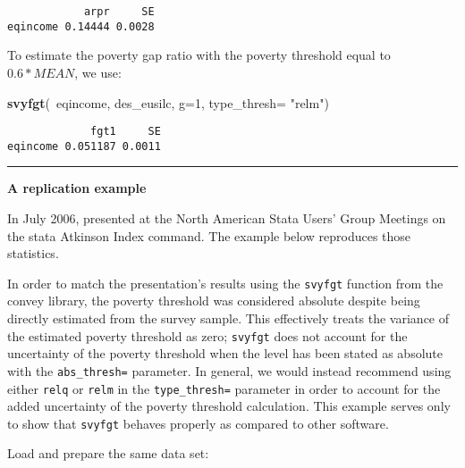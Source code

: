 \documentclass[]{book}
\newenvironment{Shaded}{\begin{snugshade}}{\end{snugshade}}
\newcommand{\KeywordTok}[1]{\textcolor[rgb]{0.13,0.29,0.53}{\textbf{{#1}}}}
\newcommand{\DataTypeTok}[1]{\textcolor[rgb]{0.13,0.29,0.53}{{#1}}}
\newcommand{\DecValTok}[1]{\textcolor[rgb]{0.00,0.00,0.81}{{#1}}}
\newcommand{\StringTok}[1]{\textcolor[rgb]{0.31,0.60,0.02}{{#1}}}
\newcommand{\NormalTok}[1]{{#1}}
\begin{document}
\begin{verbatim}
            arpr     SE
eqincome 0.14444 0.0028
\end{verbatim}

To estimate the poverty gap ratio with the poverty threshold equal to
\(0.6*MEAN\), we use:

\begin{Shaded}
\begin{Highlighting}[]
\KeywordTok{svyfgt}\NormalTok{(~eqincome, des_eusilc, }\DataTypeTok{g=}\DecValTok{1}\NormalTok{, }\DataTypeTok{type_thresh=} \StringTok{"relm"}\NormalTok{)}
\end{Highlighting}
\end{Shaded}

\begin{verbatim}
             fgt1     SE
eqincome 0.051187 0.0011
\end{verbatim}

\begin{center}\rule{0.5\linewidth}{\linethickness}\end{center}

\textbf{A replication example}

In July 2006, \citet{jenkins2006} presented at the North American Stata
Users' Group Meetings on the stata Atkinson Index command. The example
below reproduces those statistics.

In order to match the presentation's results using the \texttt{svyfgt}
function from the convey library, the poverty threshold was considered
absolute despite being directly estimated from the survey sample. This
effectively treats the variance of the estimated poverty threshold as
zero; \texttt{svyfgt} does not account for the uncertainty of the
poverty threshold when the level has been stated as absolute with the
\texttt{abs\_thresh=} parameter. In general, we would instead recommend
using either \texttt{relq} or \texttt{relm} in the
\texttt{type\_thresh=} parameter in order to account for the added
uncertainty of the poverty threshold calculation. This example serves
only to show that \texttt{svyfgt} behaves properly as compared to other
software.

Load and prepare the same data set:
\end{document}
